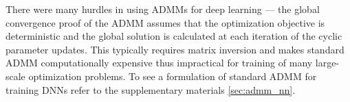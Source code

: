 

There were many hurdles in using ADMMs for deep learning --- the global convergence proof of the ADMM \cite{deng2016global} assumes that the optimization objective is deterministic and the global solution is calculated at each iteration of the cyclic parameter updates.
This typically requires matrix inversion and makes standard ADMM computationally expensive thus impractical for training of many large-scale optimization problems. To see a formulation of standard ADMM for training DNNs refer to the supplementary materials \ref{sec:admm_nn}.  %


